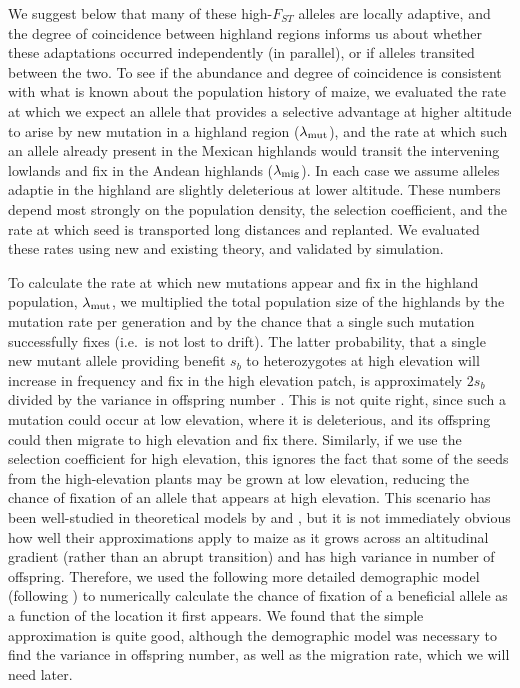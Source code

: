 We suggest below that many of these high-$F_{ST}$ alleles are locally adaptive,
and the degree of coincidence between highland regions informs us about 
whether these adaptations occurred independently (in parallel), or if alleles transited between the two.
To see if the abundance and degree of coincidence is consistent with what is known about the population history of maize,
we evaluated the rate at which we expect an allele that provides a selective advantage at higher altitude
to arise by new mutation in a highland region ($\lambda_{\text{mut}}$),
and the rate at which such an allele already present in the Mexican highlands
would transit the intervening lowlands and fix in the Andean highlands ($\lambda_{\text{mig}}$). 
In each case we assume alleles adaptie in the highland are slightly deleterious at lower altitude.
These numbers depend most strongly on the population density, 
the selection coefficient,
and the rate at which seed is transported long distances and replanted.
We evaluated these rates using new and existing theory, and validated by simulation.


To calculate the rate at which new mutations appear and fix in the highland population, $\lambda_{\text{mut}}$,
we multiplied the total population size of the highlands by the mutation rate per generation
and by the chance that a single such mutation successfully fixes
(i.e.\ is not lost to drift).
The latter probability, that a single new mutant allele providing benefit $s_b$ to heterozygotes at high elevation
will increase in frequency and fix in the high elevation patch,
is approximately $2s_b$ divided by the variance in offspring number \citep{jagers1975branching}.
This is not quite right, since such a mutation could occur at low elevation,
where it is deleterious,
and its offspring could then migrate to high elevation and fix there.
Similarly, if we use the selection coefficient for high elevation,
this ignores the fact that some of the seeds from the high-elevation plants may be grown at low elevation,
reducing the chance of fixation of an allele that appears at high elevation.
This scenario has been well-studied in theoretical models by \citet{polk} and \citet{barton1987establishment},
but it is not immediately obvious how well their approximations apply to maize 
as it grows across an altitudinal gradient (rather than an abrupt transition) and has high variance in number of offspring.
Therefore, we used the following more detailed demographic model (following \citet{vanHeerwaarden2010}) 
to numerically calculate the chance of fixation of a beneficial allele
as a function of the location it first appears.
We found that the simple approximation is quite good,
although the demographic model was necessary to find the variance in offspring number,
as well as the migration rate, which we will need later.

